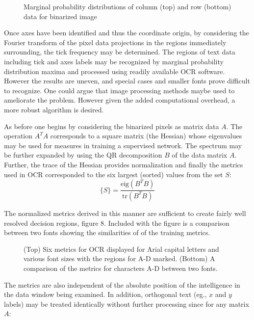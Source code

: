 \documentclass[12pt]{article}
\newcommand{\beq}{\begin{equation}}
\newcommand{\eeq}{\end{equation}}
\begin{document}
\begin{figure}

\begin{center}

\caption{Marginal probability distributions of column (top) and row (bottom) data for binarized image}
\end{center}
\end{figure}


Once axes have been identified and thus the coordinate origin, by considering the Fourier transform of the pixel data projections in the regions immediately surrounding, the tick frequency may be determined. The regions of text data including tick and axes labels may be recognized by marginal probability distribution maxima and processed using readily available OCR software. However the results are uneven, and special cases and smaller fonts prove difficult to recognize. One could argue that image processing methods maybe used to ameliorate the problem. However given the added computational overhead, a more robust algorithm is desired. 

As before one begins by considering the binarized pixels as matrix data $A$. The operation $A^TA$ corresponds to a square matrix (the Hessian) whose eigenvalues may be used for measures in training a supervised network. The spectrum may be further expanded by using the QR decomposition $B$ of the data matrix $A$. Further, the trace of the Hessian provides normalization and finally the metrics used in OCR corresponded to the six largest (sorted) values from the set $S$:
\beq \{S\}=\frac{\mbox{eig}(B^TB)}{\mbox{tr}(B^TB)} \eeq

The normalized metrics derived in this manner are sufficient to create fairly well resolved decision regions, figure 8. Included with the figure is a comparison between two fonts showing the similarities of of the training metrics.
  \begin{figure}

  \begin{center}
\caption{(Top) Six metrics for OCR displayed for Arial capital letters and various font sizes with the regions for A-D marked. (Bottom) A comparison of the metrics for characters A-D between two fonts.}
\end{center}
\end{figure}

 The metrics  are also independent of the absolute position of the intelligence in the data window being examined. In addition, orthogonal text (eg., $x$ and $y$ labels) may be treated identically without further processing since for any matrix $A$:
\end{document}
